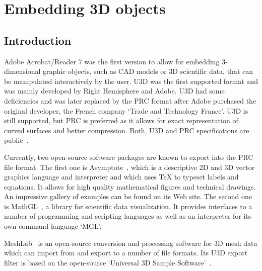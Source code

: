 \documentclass[a4paper]{article}
\begin{document}
\clearpage
\section[Embedding 3D objects (with examples)]{Embedding 3D objects}
\subsection{Introduction}\label{sec:3Dintro}
Adobe Acrobat/Reader 7 was the first version to allow for embedding 3-di\-men\-sion\-al graphic objects, such as CAD models or 3D scientific data, that can be manipulated interactively by the user. U3D was the first supported format and was mainly developed by Right Hemisphere and Adobe. U3D had some deficiencies and was later replaced by the PRC format after Adobe purchased the original developer, the French company `Trade and Technology France'. U3D is still supported, but PRC is preferred as it allows for exact representation of curved surfaces and better compression. Both, U3D and PRC specifications are public~\cite{u3d,prc}.

Currently, two open-source software packages are known to export into the PRC file format. The first one is Asymptote~\cite{asy}, which is a descriptive 2D and 3D vector graphics language and interpreter and which uses \TeX{} to typeset labels and equations. It allows for high quality mathematical figures and technical drawings. An impressive gallery of examples can be found on its Web site. The second one is MathGL~\cite{mathgl}, a library for scientific data visualization. It provides interfaces to a number of programming and scripting languages as well as an interpreter for its own command language `MGL'.

MeshLab~\cite{meshlab} is an open-source conversion and processing software for 3D mesh data which can import from and export to a number of file formats. Its U3D export filter is based on the open-source `Universal 3D Sample Software'~\cite{u3dlib}.
\end{document}
